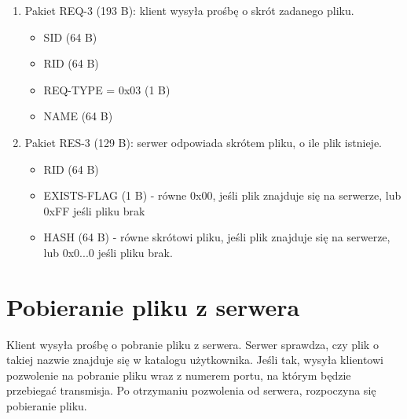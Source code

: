 \documentclass{article}
\begin{document}
	\begin{enumerate}
		\item Pakiet REQ-3 \label{REQ-3} (193 B): klient wysyła prośbę o skrót zadanego pliku. 
		\begin{itemize}
			\item SID (64 B)
			\item RID (64 B)
			\item REQ-TYPE = 0x03 (1 B)
			\item NAME (64 B)
		\end{itemize}
		
		\item Pakiet RES-3 \label{RES-3} (129 B): serwer odpowiada skrótem pliku, o ile plik istnieje.  
		\begin{itemize}
			\item RID (64 B)
			\item EXISTS-FLAG (1 B) - równe 0x00, jeśli plik znajduje się na serwerze, lub 0xFF jeśli pliku brak
			\item HASH (64 B) - równe skrótowi pliku, jeśli plik znajduje się na serwerze, lub 0x0...0 jeśli pliku brak. 
		\end{itemize}
		
	\end{enumerate}

	\section{Pobieranie pliku z serwera}
	Klient wysyła prośbę o pobranie pliku z serwera. Serwer sprawdza, czy plik o takiej nazwie znajduje się w katalogu użytkownika. Jeśli tak, wysyła klientowi pozwolenie na pobranie pliku wraz z numerem portu, na którym będzie przebiegać transmisja. Po otrzymaniu pozwolenia od serwera, rozpoczyna się pobieranie pliku. 
	
\end{document}
